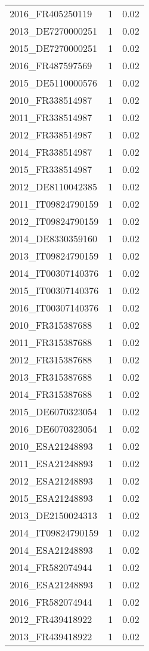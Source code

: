 \begin{table*}[htbp]
\begin{tabular}{lrr}
2016_FR405250119 & 1 & 0.02 \\
2013_DE7270000251 & 1 & 0.02 \\
2015_DE7270000251 & 1 & 0.02 \\
2016_FR487597569 & 1 & 0.02 \\
2015_DE5110000576 & 1 & 0.02 \\
2010_FR338514987 & 1 & 0.02 \\
2011_FR338514987 & 1 & 0.02 \\
2012_FR338514987 & 1 & 0.02 \\
2014_FR338514987 & 1 & 0.02 \\
2015_FR338514987 & 1 & 0.02 \\
2012_DE8110042385 & 1 & 0.02 \\
2011_IT09824790159 & 1 & 0.02 \\
2012_IT09824790159 & 1 & 0.02 \\
2014_DE8330359160 & 1 & 0.02 \\
2013_IT09824790159 & 1 & 0.02 \\
2014_IT00307140376 & 1 & 0.02 \\
2015_IT00307140376 & 1 & 0.02 \\
2016_IT00307140376 & 1 & 0.02 \\
2010_FR315387688 & 1 & 0.02 \\
2011_FR315387688 & 1 & 0.02 \\
2012_FR315387688 & 1 & 0.02 \\
2013_FR315387688 & 1 & 0.02 \\
2014_FR315387688 & 1 & 0.02 \\
2015_DE6070323054 & 1 & 0.02 \\
2016_DE6070323054 & 1 & 0.02 \\
2010_ESA21248893 & 1 & 0.02 \\
2011_ESA21248893 & 1 & 0.02 \\
2012_ESA21248893 & 1 & 0.02 \\
2015_ESA21248893 & 1 & 0.02 \\
2013_DE2150024313 & 1 & 0.02 \\
2014_IT09824790159 & 1 & 0.02 \\
2014_ESA21248893 & 1 & 0.02 \\
2014_FR582074944 & 1 & 0.02 \\
2016_ESA21248893 & 1 & 0.02 \\
2016_FR582074944 & 1 & 0.02 \\
2012_FR439418922 & 1 & 0.02 \\
2013_FR439418922 & 1 & 0.02 \\

\end{tabular}
\end{table*}
